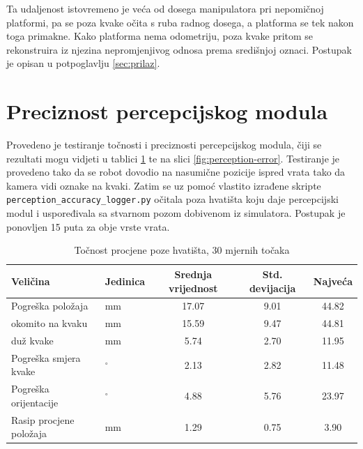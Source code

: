 Ta udaljenost istovremeno je veća od dosega manipulatora pri nepomičnoj platformi, pa se poza
kvake očita s ruba radnog dosega, a platforma se tek nakon toga primakne. Kako platforma nema
odometriju, poza kvake pritom se rekonstruira iz njezina nepromjenjivog odnosa prema središnjoj
oznaci. Postupak je opisan u potpoglavlju \ref{sec:prilaz}.

\section{Preciznost percepcijskog modula}
\label{sec:perception-error}

Provedeno je testiranje točnosti i preciznosti percepcijskog modula, čiji se rezultati mogu
vidjeti u tablici \ref{tab:tocnost-percepcije} te na slici \ref{fig:perception-error}.
Testiranje je provedeno tako da se robot dovodio na nasumične pozicije ispred vrata tako da kamera
vidi oznake na kvaki. Zatim se uz pomoć vlastito izrađene skripte \texttt{perception\_accuracy\_logger.py}
očitala poza hvatišta koju daje percepcijski modul i uspoređivala sa stvarnom pozom dobivenom iz simulatora.
Postupak je ponovljen 15 puta za obje vrste vrata.

\begin{table}[H]
    \centering
    \caption{Točnost procjene poze hvatišta, 30 mjernih točaka}
    \label{tab:tocnost-percepcije}
    \begin{tabular}{@{}llccc@{}}
        \toprule
        Veličina                & Jedinica & Srednja vrijednost & Std. devijacija & Najveća \\
        \midrule
        Pogreška položaja       & mm       & 17.07              & 9.01            & 44.82   \\
        \quad okomito na kvaku  & mm       & 15.59              & 9.47            & 44.81   \\
        \quad duž kvake         & mm       & 5.74               & 2.70            & 11.95   \\
        Pogreška smjera kvake   & $^\circ$ & 2.13               & 2.82            & 11.48   \\
        Pogreška orijentacije   & $^\circ$ & 4.88               & 5.76            & 23.97   \\
        Rasip procjene položaja & mm       & 1.29               & 0.75            & 3.90    \\
        \bottomrule
    \end{tabular}
\end{table}


